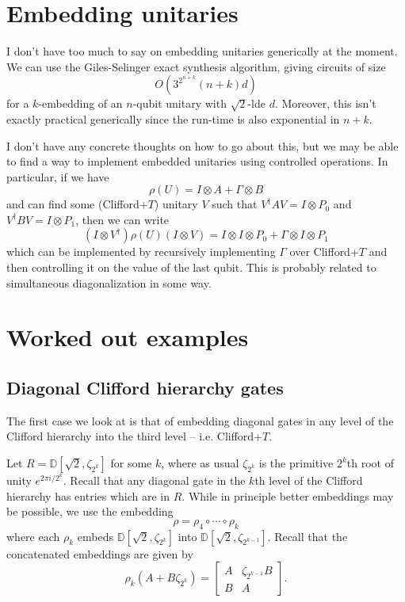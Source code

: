 \documentclass{article}
\theoremstyle{definition}
\theoremstyle{theorem}
\theoremstyle{remark}
\begin{document}
\section{Embedding unitaries}

I don't have too much to say on embedding unitaries generically at the moment. We can use the Giles-Selinger exact synthesis algorithm, giving circuits of size
\[
	O(3^{2^{n+k}}(n+k)d)
\]
for a $k$-embedding of an $n$-qubit unitary with $\sqrt{2}$-lde $d$. Moreover, this isn't exactly practical generically since the run-time is also exponential in $n+k$.

I don't have any concrete thoughts on how to go about this, but we may be able to find a way to implement embedded unitaries using controlled operations. In particular, if we have 
\[
	\rho(U) = I\otimes A + \Gamma\otimes B
\]
and can find some (Clifford+$T$) unitary $V$ such that $V^\dagger AV = I\otimes P_0$ and $V^\dagger BV = I\otimes P_1$, then we can write
\[
	(I\otimes V^\dagger)\rho(U)(I\otimes V) = I\otimes I\otimes P_0 + \Gamma\otimes I \otimes P_1
\]
which can be implemented by recursively implementing $\Gamma$ over Clifford+$T$ and then controlling it on the value of the last qubit. This is probably related to simultaneous diagonalization in some way.

\section{Worked out examples}

\subsection{Diagonal Clifford hierarchy gates}

The first case we look at is that of embedding diagonal gates in any level of the Clifford hierarchy into the third level -- i.e. Clifford+$T$.

Let $R=\mathbb{D}[\sqrt{2}, \zeta_{2^k}]$ for some $k$, where as usual $\zeta_{2^k}$ is the primitive $2^k$th root of unity $e^{2\pi i / 2^k}$. Recall that any diagonal gate in the $k$th level of the Clifford hierarchy has entries which are in $R$. While in principle better embeddings may be possible, we use the embedding 
\[
	\rho = \rho_4\circ \cdots \circ \rho_k
\]
where each $\rho_k$ embeds $\mathbb{D}[\sqrt{2}, \zeta_{2^k}]$ into $\mathbb{D}[\sqrt{2}, \zeta_{2^{k-1}}]$. Recall that the concatenated embeddings are given by
\[
	\rho_k(A + B\zeta_{2^k}) = \begin{bmatrix} A & \zeta_{2^{k-1}}B \\ B & A \end{bmatrix}.
\]
\end{document}
